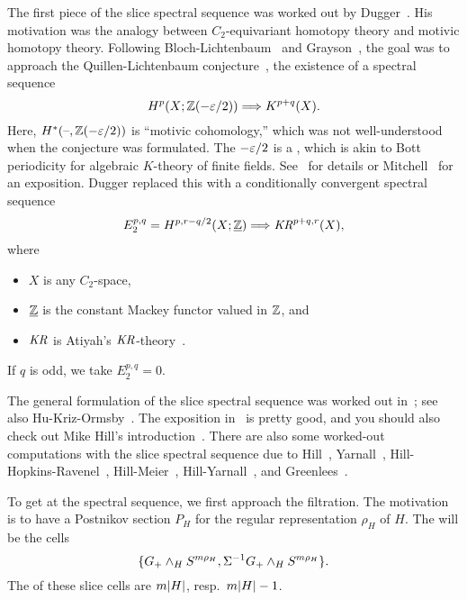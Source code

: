 The first piece of the slice spectral sequence was worked out by Dugger~\cite{DuggerKR}. His motivation was the
analogy between $C_2$-equivariant homotopy theory and motivic homotopy theory. Following
Bloch-Lichtenbaum~\cite{BlochLichtenbaum} and Grayson~\cite{Grayson}, the goal was to approach the
Quillen-Lichtenbaum conjecture~\cite{Quillen}, the existence of a spectral sequence
\[H^p(X; \mathbb Z(-\varepsilon/2))\Longrightarrow K^{p+q}(X).\]
Here, $H^*(\text{--},\mathbb Z(-\varepsilon/2))$ is ``motivic cohomology,'' which was not well-understood when the conjecture was
formulated. The $-\varepsilon/2$ is a , which is akin to Bott periodicity for algebraic $K$-theory of
finite fields. See~\cite{BlochLichtenbaum, Grayson} for details or Mitchell~\cite{Mitchell} for an exposition.
Dugger replaced this with a conditionally convergent spectral sequence
\[E_2^{p,q} = H^{p,r-q/2}(X;\underline{\mathbb Z})\Longrightarrow \mathit{KR}^{p+q,r}(X),\]
where
\begin{itemize}
	\item $X$ is any $C_2$-space,
	\item $\underline{\mathbb Z}$ is the constant Mackey functor valued in $\mathbb Z$, and
	\item $\mathit{KR}$ is Atiyah's $\mathit{KR}$-theory~\cite{AtiyahKR}.
\end{itemize}
If $q$ is odd, we take $E_2^{p,q} = 0$.

The general formulation of the slice spectral sequence was worked out in~\cite{HHR}; see also
Hu-Kriz-Ormsby~\cite{HKO11}. The exposition in~\cite{HHR} is pretty good, and you should also check out Mike Hill's
introduction~\cite{HillSlice}.  There are also some worked-out computations with the slice spectral sequence due to
Hill~\cite{HillRealBordism}, Yarnall~\cite{Yarnall}, Hill-Hopkins-Ravenel~\cite{HHR_HZ, HHR_C4},
Hill-Meier~\cite{HillMeier}, Hill-Yarnall~\cite{HillYarnall}, and Greenlees~\cite{GreenCalc}.

To get at the spectral sequence, we first approach the filtration. The motivation is to have a Postnikov section
$P_H$ for the regular representation $\rho_H$ of $H$. The  will be the cells
\[\{G_+\wedge_H S^{m\rho_H}, \Sigma^{-1}G_+\wedge_H S^{m\rho_H}\}.\]
The  of these slice cells are $m\lvert H\rvert$, resp.\ $m\lvert H\rvert - 1$.

